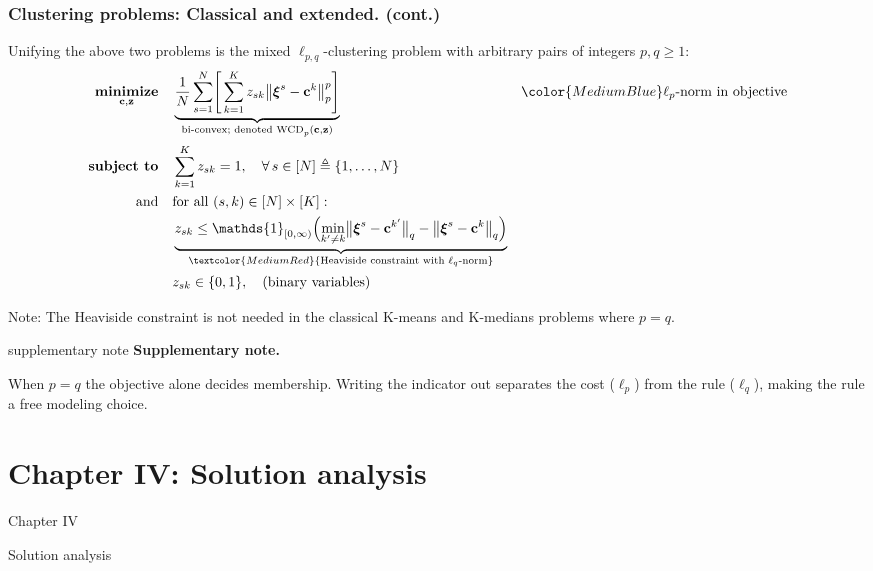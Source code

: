 \documentclass[aspectratio=169,xcolor=dvipsnames]{beamer}
\newenvironment{supplementarynote}{%
  \vspace{0.08cm}%
  \begin{beamercolorbox}[
    wd=\textwidth,sep=0.08cm,leftskip=0.08cm,rightskip=0.08cm
  ]{supplementary note}%
  \footnotesize
  \textcolor{SupplementAccent}{\textbf{Supplementary note.}}\enspace
}{%
  \end{beamercolorbox}%
}
\begin{document}
\begin{frame}
  \frametitle{Clustering problems:
    {\normalsize\mdseries Classical and extended.} (cont.)}

  \footnotesize
  \setlength{\abovedisplayskip}{2pt}
  \setlength{\belowdisplayskip}{2pt}

  Unifying the above two problems is the mixed $\ell_{p,q}$-clustering
  problem with arbitrary pairs of integers $p,q\geq 1$:
  \vspace{-0.22cm}
  \[
    \begin{aligned}
      \operatorname*{\textbf{minimize}}_{\mathbf{c},\mathbf{z}}\quad
      &\underbrace{\frac{1}{N}\sum_{s=1}^{N}\Biggl[\,\sum_{k=1}^{K}z_{sk}
        \bigl\|\boldsymbol{\xi}^s-\mathbf{c}^k\bigr\|_p^p\Biggr]}_
        {\text{bi-convex; denoted WCD}_p(\mathbf{c},\mathbf{z})}
      &&{\color{MediumBlue}\ell_p\text{-norm in objective}}\\[1pt]
      \operatorname*{\textbf{subject to}}\quad
      &\sum_{k=1}^{K}z_{sk}=1,\quad\forall\,s\in[N]\triangleq
        \{1,\ldots,N\}\\
      \text{and}\quad&\text{for all }(s,k)\in[N]\times[K]:\\
      &\underbrace{z_{sk}\leq\mathds{1}_{[0,\infty)}\Bigl(
        \min_{k'\neq k}\bigl\|\boldsymbol{\xi}^s-\mathbf{c}^{k'}\bigr\|_q
        -\bigl\|\boldsymbol{\xi}^s-\mathbf{c}^{k}\bigr\|_q\Bigr)}_
        {\textcolor{MediumRed}{\text{Heaviside constraint with }
          \ell_q\text{-norm}}}\\[1pt]
      &z_{sk}\in\{0,1\},\quad\text{(binary variables)}
    \end{aligned}
  \]

  \textcolor{MediumRed}{Note:} The Heaviside constraint is not needed in the
  classical K-means and K-medians problems where $p=q$.

  \begin{supplementarynote}
    When $p=q$ the objective alone decides membership. Writing the indicator
    out separates the cost ($\ell_p$) from the rule ($\ell_q$), making the
    rule a free modeling choice.
  \end{supplementarynote}
\end{frame}

\section{Chapter IV: Solution analysis}

\begin{frame}[plain]
  \hypertarget{chapter-solution-analysis}{}
  \centering
  \vfill
  {Chapter IV\par}
  \vspace{0.34cm}
  {\mdseries\large
    Solution analysis\par}
  \vfill
\end{frame}
\end{document}
